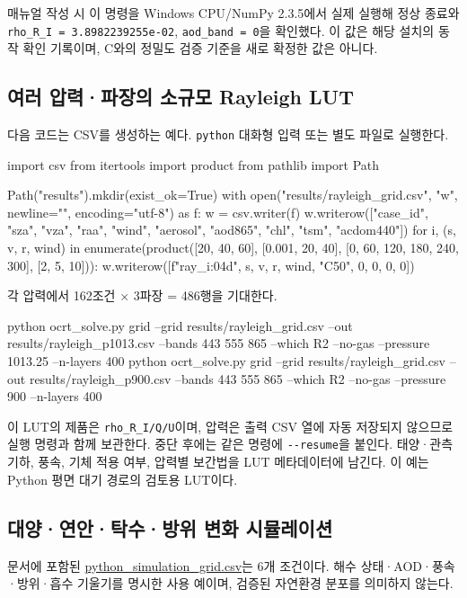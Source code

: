 매뉴얼 작성 시 이 명령을 Windows CPU/NumPy 2.3.5에서 실제 실행해 정상 종료와 \texttt{rho\_\allowbreak{}R\_\allowbreak{}I =\allowbreak{} 3.\allowbreak{}8982239255e-\allowbreak{}02}, \texttt{aod\_\allowbreak{}band =\allowbreak{} 0}을 확인했다. 이 값은 해당 설치의 동작 확인 기록이며, C와의 정밀도 검증 기준을 새로 확정한 값은 아니다.

\subsection{여러 압력·파장의 소규모 Rayleigh LUT}
\label{sec:auto:06_python_batch:7.2}
다음 코드는 CSV를 생성하는 예다. \texttt{python} 대화형 입력 또는 별도 파일로 실행한다.


\begin{ManualCode}
import csv
from itertools import product
from pathlib import Path

Path("results").mkdir(exist_ok=True)
with open("results/rayleigh_grid.csv", "w", newline="", encoding="utf-8") as f:
    w = csv.writer(f)
    w.writerow(["case_id", "sza", "vza", "raa", "wind", "aerosol", "aod865", "chl", "tsm", "acdom440"])
    for i, (s, v, r, wind) in enumerate(product([20, 40, 60], [0.001, 20, 40], [0, 60, 120, 180, 240, 300], [2, 5, 10])):
        w.writerow([f"ray_{i:04d}", s, v, r, wind, "C50", 0, 0, 0, 0])
\end{ManualCode}

각 압력에서 162조건 \ensuremath{\times} 3파장 = 486행을 기대한다.


\begin{ManualCode}
python ocrt_solve.py grid --grid results/rayleigh_grid.csv --out results/rayleigh_p1013.csv --bands 443 555 865 --which R2 --no-gas --pressure 1013.25 --n-layers 400
python ocrt_solve.py grid --grid results/rayleigh_grid.csv --out results/rayleigh_p900.csv --bands 443 555 865 --which R2 --no-gas --pressure 900 --n-layers 400
\end{ManualCode}

이 LUT의 제품은 \texttt{rho\_\allowbreak{}R\_\allowbreak{}I/\allowbreak{}Q/\allowbreak{}U}이며, 압력은 출력 CSV 열에 자동 저장되지 않으므로 실행 명령과 함께 보관한다. 중단 후에는 같은 명령에 \texttt{-\allowbreak{}-\allowbreak{}resume}을 붙인다. 태양·관측 기하, 풍속, 기체 적용 여부, 압력별 보간법을 LUT 메타데이터에 남긴다. 이 예는 Python 평면 대기 경로의 검토용 LUT이다.

\subsection{대양·연안·탁수·방위 변화 시뮬레이션}
\label{sec:auto:06_python_batch:7.3}
문서에 포함된 \href{https://github.com/brtnt/OCRT/blob/main/docs/manual/examples/python_simulation_grid.csv}{python\_simulation\_grid.csv}는 6개 조건이다. 해수 상태·AOD·풍속·방위·흡수 기울기를 명시한 사용 예이며, 검증된 자연환경 분포를 의미하지 않는다.


